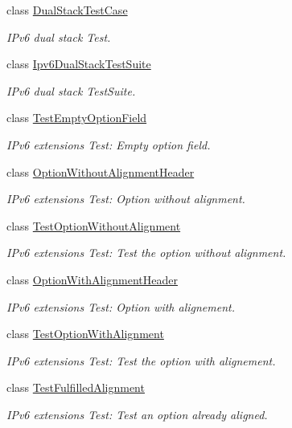 \begin{DoxyCompactItemize}
class \hyperlink{classDualStackTestCase}{Dual\+Stack\+Test\+Case}
\begin{DoxyCompactList}\small\item\em I\+Pv6 dual stack Test. \end{DoxyCompactList}\item 
class \hyperlink{classIpv6DualStackTestSuite}{Ipv6\+Dual\+Stack\+Test\+Suite}
\begin{DoxyCompactList}\small\item\em I\+Pv6 dual stack Test\+Suite. \end{DoxyCompactList}\item 
class \hyperlink{classTestEmptyOptionField}{Test\+Empty\+Option\+Field}
\begin{DoxyCompactList}\small\item\em I\+Pv6 extensions Test\+: Empty option field. \end{DoxyCompactList}\item 
class \hyperlink{classOptionWithoutAlignmentHeader}{Option\+Without\+Alignment\+Header}
\begin{DoxyCompactList}\small\item\em I\+Pv6 extensions Test\+: Option without alignment. \end{DoxyCompactList}\item 
class \hyperlink{classTestOptionWithoutAlignment}{Test\+Option\+Without\+Alignment}
\begin{DoxyCompactList}\small\item\em I\+Pv6 extensions Test\+: Test the option without alignment. \end{DoxyCompactList}\item 
class \hyperlink{classOptionWithAlignmentHeader}{Option\+With\+Alignment\+Header}
\begin{DoxyCompactList}\small\item\em I\+Pv6 extensions Test\+: Option with alignement. \end{DoxyCompactList}\item 
class \hyperlink{classTestOptionWithAlignment}{Test\+Option\+With\+Alignment}
\begin{DoxyCompactList}\small\item\em I\+Pv6 extensions Test\+: Test the option with alignement. \end{DoxyCompactList}\item 
class \hyperlink{classTestFulfilledAlignment}{Test\+Fulfilled\+Alignment}
\begin{DoxyCompactList}\small\item\em I\+Pv6 extensions Test\+: Test an option already aligned. \end{DoxyCompactList}\item 

\end{DoxyCompactItemize}
